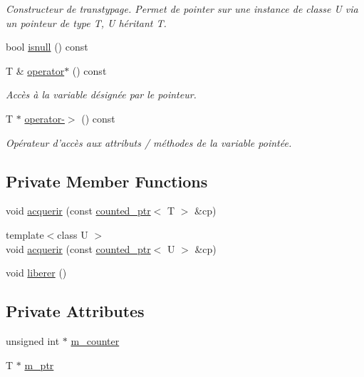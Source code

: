 \begin{DoxyCompactItemize}
\begin{DoxyCompactList}\small\item\em Constructeur de transtypage. Permet de pointer sur une instance de classe U via un pointeur de type T, U héritant T. \end{DoxyCompactList}\item 
bool \hyperlink{classcounted__ptr_a4d951309592e9186940afe98c07ed72e}{isnull} () const 
\item 
T \& \hyperlink{classcounted__ptr_aa7b22a5b53011b29dbebab1ec7acbe17}{operator$\ast$} () const 
\begin{DoxyCompactList}\small\item\em Accès à la variable désignée par le pointeur. \end{DoxyCompactList}\item 
T $\ast$ \hyperlink{classcounted__ptr_aa50f9c6eee8e60d42a8fa6fff232be6c}{operator-\/$>$} () const 
\begin{DoxyCompactList}\small\item\em Opérateur d'accès aux attributs / méthodes de la variable pointée. \end{DoxyCompactList}\end{DoxyCompactItemize}
\subsection*{Private Member Functions}
\begin{DoxyCompactItemize}
\item 
void \hyperlink{classcounted__ptr_a1e2f4d7eb63dd5757e9a3f2f701423a3}{acquerir} (const \hyperlink{classcounted__ptr}{counted\-\_\-ptr}$<$ T $>$ \&cp)
\item 
{\footnotesize template$<$class U $>$ }\\void \hyperlink{classcounted__ptr_a895493d30acc074bcdb2debd4978427a}{acquerir} (const \hyperlink{classcounted__ptr}{counted\-\_\-ptr}$<$ U $>$ \&cp)
\item 
void \hyperlink{classcounted__ptr_a0b9693015481176159f87f26e530409d}{liberer} ()
\end{DoxyCompactItemize}
\subsection*{Private Attributes}
\begin{DoxyCompactItemize}
\item 
unsigned int $\ast$ \hyperlink{classcounted__ptr_abf02f680f71697211394ebdfb47f14ff}{m\-\_\-counter}
\item 
T $\ast$ \hyperlink{classcounted__ptr_adfc589214b83bdd53c7640d8374f1098}{m\-\_\-ptr}
\end{DoxyCompactItemize}
